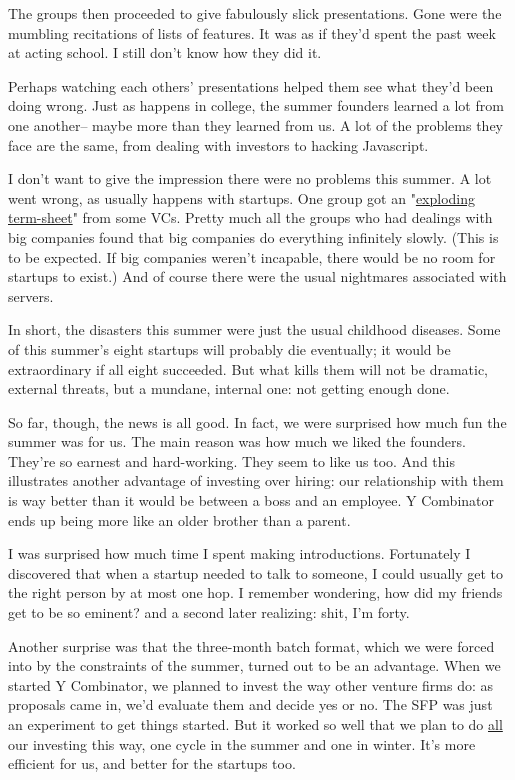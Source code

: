 The groups then proceeded to give fabulously slick presentations. 
Gone were the mumbling recitations of lists of features.   It was
as if they'd spent the past week at acting school.  I still don't 
know how they did it.

Perhaps watching each others' presentations helped them see what
they'd been doing wrong.  Just as happens in college, the summer   
founders learned a lot from one another-- maybe more than they
learned from us.  A lot of the problems they face are the same,  
from dealing with investors to hacking Javascript.

I don't want to give the impression there were no problems this  
summer.  A lot went wrong, as usually happens with startups.  One
group got an "\href{http://www.ventureblog.com/articles/indiv/2003/000024.html}{exploding
term-sheet}" from some VCs.  Pretty much all the groups who had
dealings with big companies found that big companies do everything
infinitely slowly.  (This is to be expected.  If big companies
weren't incapable, there would be no room for startups to exist.)
And of course there were the usual nightmares associated with
servers.  

In short, the disasters this summer were just the usual childhood
diseases.  Some of this summer's eight startups will   
probably die eventually; it would be extraordinary if all eight 
succeeded.  But what kills them will not be dramatic, external    
threats, but a mundane, internal one: not getting enough done.

So far, though, the news is all good.  In fact, we were surprised
how much fun the summer was for us.  The main reason was how much
we liked the founders.  They're so earnest and hard-working.  They
seem to like us too.  And this illustrates another advantage of
investing over hiring: our relationship with them is way better   
than it would be between a boss and an employee.  Y Combinator ends
up being more like an older brother than a parent.

I was surprised how much time I spent making introductions.
Fortunately I discovered that when a startup needed to talk to
someone, I could usually get to the right person by at most one
hop.  I remember wondering, how did my friends get to be so eminent?
and a second later realizing: shit, I'm forty.

Another surprise was that the three-month batch format,
which we were forced into by the constraints of the summer, turned
out to be an advantage.  When we started Y Combinator, we planned
to invest the way other venture firms do: as proposals came in,     
we'd evaluate them and decide yes or no.  The SFP
was just an experiment to get things started.  But it worked so
well that we plan to do 
\href{http://ycombinator.com/funding.html}{all} 
our investing this way, one cycle in
the summer and one in winter.  It's more efficient for us, and
better for the startups too.

